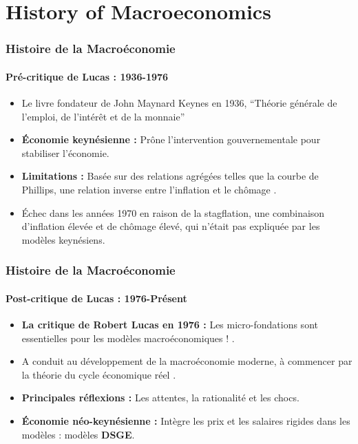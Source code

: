 \documentclass{beamer}
\begin{document}
\section{History of Macroeconomics}
\begin{frame}
    \frametitle{Histoire de la Macroéconomie}
    \framesubtitle{Pré-critique de Lucas : 1936-1976}
        \begin{itemize}
            \item Le livre fondateur de John Maynard Keynes en 1936, \enquote{Théorie générale de l'emploi, de l'intérêt et de la monnaie}
            \item \textbf{Économie keynésienne :} Prône l'intervention gouvernementale pour stabiliser l'économie.
            \item \textbf{Limitations :} Basée sur des relations agrégées telles que la courbe de Phillips,
            une relation inverse entre l'inflation et le chômage \parencite{Phillips_1958}.
            \item Échec dans les années 1970 en raison de la stagflation, une combinaison d'inflation élevée et de chômage élevé,
            qui n'était pas expliquée par les modèles keynésiens.
        \end{itemize}
    \end{frame}
    \begin{frame}
        \frametitle{Histoire de la Macroéconomie}
        \framesubtitle{Post-critique de Lucas : 1976-Présent}
                \begin{itemize}
                    \item \textbf{La critique de Robert Lucas en 1976 :} Les micro-fondations sont essentielles pour les modèles macroéconomiques ! \parencite{Lucas_1976}.
                    \item A conduit au développement de la macroéconomie moderne, à commencer par la théorie du cycle économique réel \textcite{Kydland_Prescott_1982}.
                    \item \textbf{Principales réflexions :} Les attentes, la rationalité et les chocs.
                    \item \textbf{Économie néo-keynésienne :} Intègre les prix et les salaires rigides dans les modèles : modèles \textbf{DSGE}.
                \end{itemize}
    \end{frame}
                        
\end{document}
